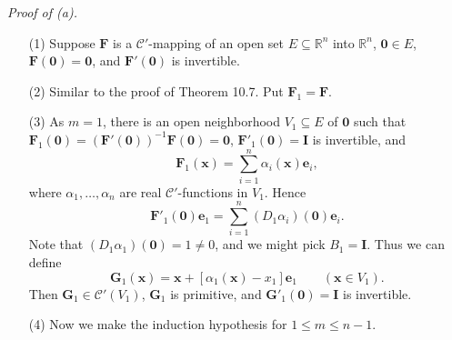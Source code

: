 \documentclass{article}
\begin{document}
\emph{Proof of (a).}
\begin{enumerate}
\item[(1)]
  Suppose $\mathbf{F}$ is a $\mathscr{C}'$-mapping of an open set $E \subseteq \mathbb{R}^n$
  into $\mathbb{R}^n$, $\mathbf{0} \in E$, $\mathbf{F}(\mathbf{0}) = \mathbf{0}$,
  and $\mathbf{F}'(\mathbf{0})$ is invertible.

\item[(2)]
  Similar to the proof of Theorem 10.7.
  Put $\mathbf{F}_1 = \mathbf{F}$.

\item[(3)]
  As $m = 1$, there is an open neighborhood $V_1 \subseteq E$ of $\mathbf{0}$
  such that
  $\mathbf{F}_1(\mathbf{0}) = (\mathbf{F}'(\mathbf{0}))^{-1} \mathbf{F}(\mathbf{0}) = \mathbf{0}$,
  $\mathbf{F}'_1(\mathbf{0}) = \mathbf{I}$ is invertible, and
  \[
    \mathbf{F}_1(\mathbf{x}) = \sum_{i=1}^{n} \alpha_i(\mathbf{x}) \mathbf{e}_i,
  \]
  where $\alpha_1, \ldots, \alpha_n$ are real $\mathscr{C}'$-functions in $V_1$.
  Hence
  \[
    \mathbf{F}'_1(\mathbf{0})\mathbf{e}_1
    = \sum_{i=1}^{n} (D_1 \alpha_i)(\mathbf{0}) \mathbf{e}_i.
  \]
  Note that $(D_1 \alpha_1)(\mathbf{0}) = 1 \neq 0$, and we might pick $B_1 = \mathbf{I}$.
  Thus we can define
  \[
    \mathbf{G}_1(\mathbf{x})
    = \mathbf{x} + [\alpha_1(\mathbf{x}) - x_1] \mathbf{e}_1
    \qquad
    (\mathbf{x} \in V_1).
  \]
  Then $\mathbf{G}_1 \in \mathscr{C}'(V_1)$, $\mathbf{G}_1$ is primitive,
  and $\mathbf{G}'_1(\mathbf{0}) = \mathbf{I}$ is invertible.

\item[(4)]
  Now we make the induction hypothesis for $1 \leq m \leq n-1$.


\end{enumerate}
\end{document}
